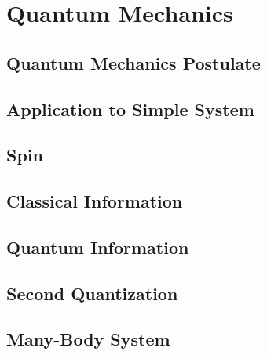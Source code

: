 \documentclass[10pt]{report}
\begin{document}
\clearpage
\setcounter{tocdepth}{2}
\tableofcontents


\chapter{Quantum Mechanics}\clearpage

\section{Quantum Mechanics Postulate}

\clearpage
\clearpage

\section{Application to Simple System}
\clearpage

\section{Spin}





\clearpage

\section{Classical Information}
\clearpage

\section{Quantum Information}

\clearpage

\section{Second Quantization}


\clearpage
\clearpage

\section{Many-Body System}


\clearpage
\end{document}
